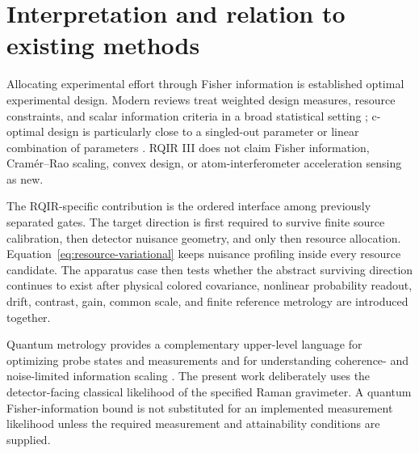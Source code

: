 \section{Interpretation and relation to existing methods}
\label{sec:interpretation}

Allocating experimental effort through Fisher information is established optimal experimental design. Modern reviews treat weighted design measures, resource constraints, and scalar information criteria in a broad statistical setting \cite{Huan2024}; c-optimal design is particularly close to a singled-out parameter or linear combination of parameters \cite{WatsonPan2023}. RQIR III does not claim Fisher information, Cram\'er--Rao scaling, convex design, or atom-interferometer acceleration sensing as new.

The RQIR-specific contribution is the ordered interface among previously separated gates. The target direction is first required to survive finite source calibration, then detector nuisance geometry, and only then resource allocation. Equation~\eqref{eq:resource-variational} keeps nuisance profiling inside every resource candidate. The apparatus case then tests whether the abstract surviving direction continues to exist after physical colored covariance, nonlinear probability readout, drift, contrast, gain, common scale, and finite reference metrology are introduced together.

Quantum metrology provides a complementary upper-level language for optimizing probe states and measurements and for understanding coherence- and noise-limited information scaling \cite{Giovannetti2011,Pezze2018,Liu2020}. The present work deliberately uses the detector-facing classical likelihood of the specified Raman gravimeter. A quantum Fisher-information bound is not substituted for an implemented measurement likelihood unless the required measurement and attainability conditions are supplied.


